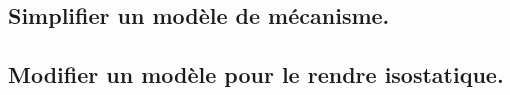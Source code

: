 \documentclass[10pt,fleqn]{book}
\newcommand{\repRel}{../..}
\newcommand{\repStyle}{\repRel/Style}
\newcommand{\td}{fichier_td}
\newcommand{\repExos}{\repRel/ExercicesCompetences}
\newcommand{\repExo}{dossier}
\begin{document}
\subsection{Simplifier un modèle de mécanisme.} 

\begin{multicols}{2} 

\end{multicols}

\subsection{Modifier un modèle pour le rendre isostatique.} 

\begin{multicols}{2} 

\renewcommand{\repExo}{\repExos/B2_ProposerModele/B2_16_Hyperstatisme/64_EPAS}
\renewcommand{\td}{64_EPAS}
\graphicspath{{\repStyle/png/}{\repExo/images/}}


\renewcommand{\repExo}{\repExos/B2_ProposerModele/B2_16_Hyperstatisme/69_TrainA350}
\renewcommand{\td}{69_TrainA350}
\graphicspath{{\repStyle/png/}{\repExo/images/}}


\renewcommand{\repExo}{\repExos/B2_ProposerModele/B2_16_Hyperstatisme/71_Robovolc}
\renewcommand{\td}{71_Robovolc}
\graphicspath{{\repStyle/png/}{\repExo/images/}}


\renewcommand{\repExo}{\repExos/B2_ProposerModele/B2_16_Hyperstatisme/71_Robovolc_02}
\renewcommand{\td}{71_Robovolc_02}
\graphicspath{{\repStyle/png/}{\repExo/images/}}


\renewcommand{\repExo}{\repExos/B2_ProposerModele/B2_16_Hyperstatisme/72_Tripteor}
\renewcommand{\td}{72_Tripteor}
\graphicspath{{\repStyle/png/}{\repExo/images/}}


\renewcommand{\repExo}{\repExos/B2_ProposerModele/B2_16_Hyperstatisme/81_Piaggio}
\renewcommand{\td}{81_Piaggio}
\graphicspath{{\repStyle/png/}{\repExo/images/}}


\renewcommand{\repExo}{\repExos/B2_ProposerModele/B2_16_Hyperstatisme/82_MAV}
\renewcommand{\td}{82_MAV}
\graphicspath{{\repStyle/png/}{\repExo/images/}}


\renewcommand{\repExo}{\repExos/B2_ProposerModele/B2_16_Hyperstatisme/83_Roburoc}
\renewcommand{\td}{79_Roburoc}
\graphicspath{{\repStyle/png/}{\repExo/images/}}


\end{multicols}
\end{document}
